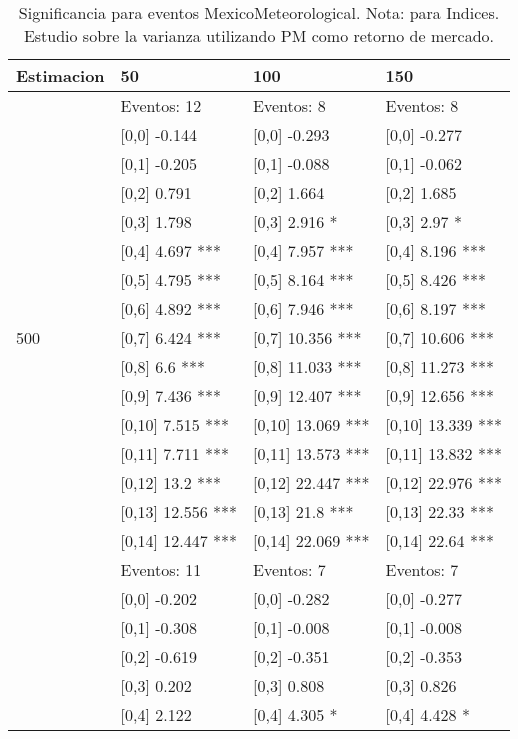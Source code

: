 \begin{table}

\caption{Significancia para eventos MexicoMeteorological. Nota: para Indices. Estudio sobre la varianza utilizando PM como retorno de mercado.}
\centering
\begin{tabular}[t]{llll}
\toprule
Estimacion & 50 & 100 & 150\\
\midrule
 & Eventos:  12 & Eventos:  8 & Eventos:  8\\
 & {}[0,0] -0.144 & {}[0,0] -0.293 & {}[0,0] -0.277\\
 & {}[0,1] -0.205 & {}[0,1] -0.088 & {}[0,1] -0.062\\
 & {}[0,2] 0.791 & {}[0,2] 1.664 & {}[0,2] 1.685\\
 & {}[0,3] 1.798 & {}[0,3] 2.916 * & {}[0,3] 2.97 *\\
\addlinespace
 & {}[0,4] 4.697 *** & {}[0,4] 7.957 *** & {}[0,4] 8.196 ***\\
 & {}[0,5] 4.795 *** & {}[0,5] 8.164 *** & {}[0,5] 8.426 ***\\
 & {}[0,6] 4.892 *** & {}[0,6] 7.946 *** & {}[0,6] 8.197 ***\\
500 & {}[0,7] 6.424 *** & {}[0,7] 10.356 *** & {}[0,7] 10.606 ***\\
 & {}[0,8] 6.6 *** & {}[0,8] 11.033 *** & {}[0,8] 11.273 ***\\
\addlinespace
 & {}[0,9] 7.436 *** & {}[0,9] 12.407 *** & {}[0,9] 12.656 ***\\
 & {}[0,10] 7.515 *** & {}[0,10] 13.069 *** & {}[0,10] 13.339 ***\\
 & {}[0,11] 7.711 *** & {}[0,11] 13.573 *** & {}[0,11] 13.832 ***\\
 & {}[0,12] 13.2 *** & {}[0,12] 22.447 *** & {}[0,12] 22.976 ***\\
 & {}[0,13] 12.556 *** & {}[0,13] 21.8 *** & {}[0,13] 22.33 ***\\
\addlinespace
 & {}[0,14] 12.447 *** & {}[0,14] 22.069 *** & {}[0,14] 22.64 ***\\
 & Eventos:  11 & Eventos:  7 & Eventos:  7\\
 & {}[0,0] -0.202 & {}[0,0] -0.282 & {}[0,0] -0.277\\
 & {}[0,1] -0.308 & {}[0,1] -0.008 & {}[0,1] -0.008\\
 & {}[0,2] -0.619 & {}[0,2] -0.351 & {}[0,2] -0.353\\
\addlinespace
 & {}[0,3] 0.202 & {}[0,3] 0.808 & {}[0,3] 0.826\\
 & {}[0,4] 2.122 & {}[0,4] 4.305 * & {}[0,4] 4.428 *\\

\end{tabular}
\end{table}
